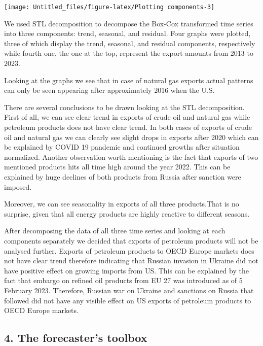 \documentclass[
]{article}
\begin{document}
\begin{center}\texttt{[image: Untitled\_files/figure-latex/Plotting components-3]} \end{center}

We used STL decomposition to decompose the Box-Cox transformed time
series into three components: trend, seasonal, and residual. Four graphs
were plotted, three of which display the trend, seasonal, and residual
components, respectively while fourth one, the one at the top, represent
the export amounts from 2013 to 2023.

Looking at the graphs we see that in case of natural gas exports actual
patterns can only be seen appearing after approximately 2016 when the
U.S.

There are several conclusions to be drawn looking at the STL
decomposition. First of all, we can see clear trend in exports of crude
oil and natural gas while petroleum products does not have clear trend.
In both cases of exports of crude oil and natural gas we can clearly see
slight drops in exports after 2020 which can be explained by COVID 19
pandemic and continued growths after situation normalized. Another
observation worth mentioning is the fact that exports of two mentioned
products hits all time high around the year 2022. This can be explained
by huge declines of both products from Russia after sanction were
imposed.

Moreover, we can see seasonality in exports of all three products.That
is no surprise, given that all energy products are highly reactive to
different seasons.

After decomposing the data of all three time series and looking at each
components separately we decided that exports of petroleum products will
not be analysed further. Exports of petroleum products to OECD Europe
markets does not have clear trend therefore indicating that Russian
invasion in Ukraine did not have positive effect on growing imports from
US. This can be explained by the fact that embargo on refined oil
products from EU 27 was introduced as of 5 February 2023. Therefore,
Russian war on Ukraine and sanctions on Russia that followed did not
have any visible effect on US exports of petroleum products to OECD
Europe markets.

\hypertarget{the-forecasters-toolbox}{%
\subsection{4. The forecaster's toolbox}\label{the-forecasters-toolbox}}
\end{document}

